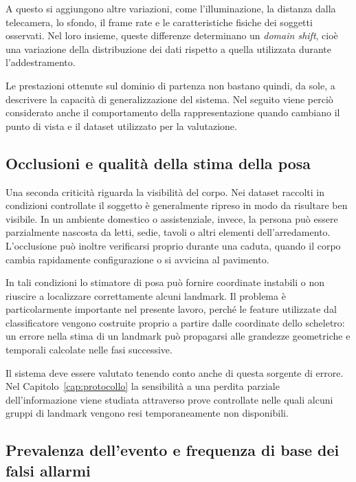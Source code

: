 
A questo si aggiungono altre variazioni, come l'illuminazione, la distanza
dalla telecamera, lo sfondo, il frame rate e le caratteristiche fisiche dei
soggetti osservati. Nel loro insieme, queste differenze determinano un
\emph{domain shift}, cioè una variazione della distribuzione dei dati
rispetto a quella utilizzata durante l'addestramento.

Le prestazioni ottenute sul dominio di partenza non bastano quindi, da sole,
a descrivere la capacità di generalizzazione del sistema. Nel seguito viene
perciò considerato anche il comportamento della rappresentazione quando
cambiano il punto di vista e il dataset utilizzato per la valutazione.

\subsection{Occlusioni e qualità della stima della posa}

Una seconda criticità riguarda la visibilità del corpo. Nei dataset raccolti
in condizioni controllate il soggetto è generalmente ripreso in modo da
risultare ben visibile. In un ambiente domestico o assistenziale, invece, la
persona può essere parzialmente nascosta da letti, sedie, tavoli o altri
elementi dell'arredamento. L'occlusione può inoltre verificarsi proprio
durante una caduta, quando il corpo cambia rapidamente configurazione o si
avvicina al pavimento.

In tali condizioni lo stimatore di posa può fornire coordinate instabili o
non riuscire a localizzare correttamente alcuni landmark. Il problema è
particolarmente importante nel presente lavoro, perché le feature utilizzate
dal classificatore vengono costruite proprio a partire dalle coordinate dello
scheletro: un errore nella stima di un landmark può propagarsi alle grandezze
geometriche e temporali calcolate nelle fasi successive.

Il sistema deve essere valutato tenendo conto anche di questa sorgente di
errore. Nel Capitolo~\ref{cap:protocollo} la sensibilità a una perdita
parziale dell'informazione viene studiata attraverso prove controllate nelle
quali alcuni gruppi di landmark vengono resi temporaneamente non disponibili.

\subsection{Prevalenza dell'evento e frequenza di base dei falsi allarmi}

